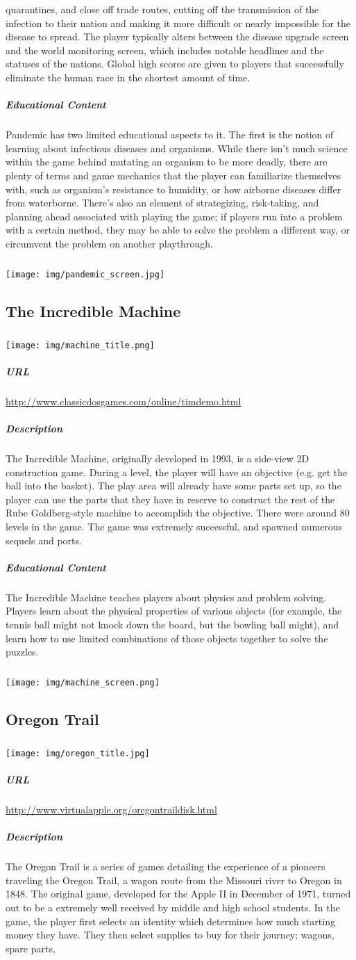 quarantines, and close off trade routes, cutting off the transmission of the infection to their nation and making it more difficult or nearly impossible for the disease to spread. The player typically alters between the disease upgrade screen and the world monitoring screen, which includes notable headlines and the statuses of the nations. Global high scores are given to players that successfully eliminate the human race in the shortest amount of time.\subparagraph{Educational Content}Pandemic has two limited educational aspects to it. The first is the notion of learning about infectious diseases and organisms. While there isn't much science within the game behind mutating an organism to be more deadly, there are plenty of terms and game mechanics that the player can familiarize themselves with, such as organism's resistance to humidity, or how airborne diseases differ from waterborne. There's also an element of strategizing, risk-taking, and planning ahead associated with playing the game; if players run into a problem with a certain method, they may be able to solve the problem a different way, or circumvent the problem on another playthrough.\subparagraph{}\texttt{[image: img/pandemic\_screen.jpg]}\subsection{The Incredible Machine}\subparagraph{}\texttt{[image: img/machine\_title.png]}\subparagraph{URL}\url{http://www.classicdosgames.com/online/timdemo.html}\subparagraph{Description}The Incredible Machine, originally developed in 1993, is a side-view 2D construction game. During a level, the player will have an objective (e.g. get the ball into the basket). The play area will already have some parts set up, so the player can use the parts that they have in reserve to construct the rest of the Rube Goldberg-style machine to accomplish the objective. There were around 80 levels in the game. The game was extremely successful, and spawned numerous sequels and ports.\subparagraph{Educational Content}The Incredible Machine teaches players about physics and problem solving. Players learn about the physical properties of various objects (for example, the tennis ball might not knock down the board, but the bowling ball might), and learn how to use limited combinations of those objects together to solve the puzzles. \subparagraph{}\texttt{[image: img/machine\_screen.png]}\subsection{Oregon Trail}\subparagraph{}\texttt{[image: img/oregon\_title.jpg]}\subparagraph{URL}\url{http://www.virtualapple.org/oregontraildisk.html}\subparagraph{Description}The Oregon Trail is a series of games detailing the experience of a pioneers traveling the Oregon Trail, a wagon route from the Missouri river to Oregon in 1848. The original game, developed for the Apple II in December of 1971, turned out to be a extremely well received by middle and high school students. In the game, the player first selects an identity which determines how much starting money they have. They then select supplies to buy for their journey; wagons, spare parts, 